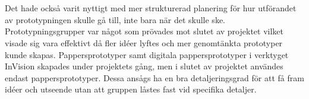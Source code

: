 \\ \\
Det hade också varit nyttigt med mer strukturerad planering för hur utförandet av prototypningen skulle gå till, inte bara när det skulle ske. Prototypningsgrupper var något som prövades mot slutet av projektet vilket visade sig vara effektivt då fler idéer lyftes och mer genomtänkta prototyper kunde skapas. Pappersprototyper samt digitala pappersprototyper i verktyget InVision skapades under projektets gång, men i slutet av projektet användes endast pappersprototyper. Dessa ansågs ha en bra detaljeringsgrad för att få fram idéer och utseende utan att gruppen låstes fast vid specifika detaljer. 








